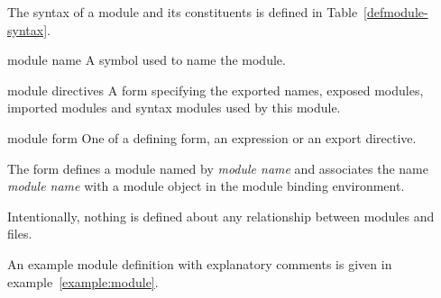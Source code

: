 %
\label{defmodule}
%
\begin{optDefinition}
%
\Syntax
\noindent
The syntax of a module and its constituents is defined in
Table~\ref{defmodule-syntax}.
%
\begin{arguments}
    \item[module name] A symbol used to name the module.
    \item[module directives] A form specifying the exported names, exposed
    modules, imported modules and syntax modules used by this module.
    \item[module form] One of a defining form, an expression or an export
    directive.
\end{arguments}
%
\remarks%
The  form defines a module named by {\em module name}
and associates the name {\em module name} with a module object in the
module binding environment.
\begin{note}
    Intentionally, nothing is defined about any relationship between modules and
    files.
\end{note}
%
\examples
An example module definition with explanatory comments is given in
example~\ref{example:module}.
%
\end{optDefinition}
